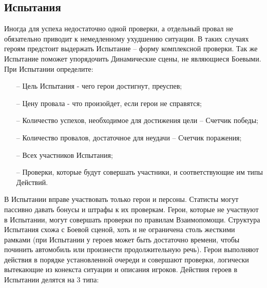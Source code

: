 \subsection{Испытания}
Иногда для успеха недостаточно одной проверки, а отдельный провал не обязательно приводит к немедленному ухудшению ситуации. В таких случаях героям предстоит выдержать Испытание – форму комплексной проверки. Так же Испытание поможет упорядочить Динамические сцены, не являющиеся Боевыми.
\newline При Испытании определите:
\begin{itemize}
\item[--]Цель Испытания - чего герои достигнут, преуспев;
\item[--]Цену провала - что произойдет, если герои не справятся;
\item[--]Количество успехов, необходимое для достижения цели – Счетчик победы;
\item[--]Количество провалов, достаточное для неудачи – Счетчик поражения;
\item[--]Всех участников Испытания;
\item[--]Проверки, которые будут совершать участники, и соответствующие им типы Действий.
\end{itemize}
В Испытании вправе участвовать только герои и персоны. Статисты могут пассивно давать бонусы и штрафы к их проверкам. Герои, которые не участвуют в Испытании, могут совершать проверки по правилам Взаимопомощи.
\newline Структура Испытания схожа с Боевой сценой, хоть и не ограничена столь жесткими рамками (при Испытании у героев может быть достаточно времени, чтобы починить автомобиль или произнести продолжительную речь). Герои выполняют действия в порядке установленной очереди и совершают проверки, логически вытекающие из конекста ситуации и описания игроков.
\newline Действия героев в Испытании делятся на 3 типа:
